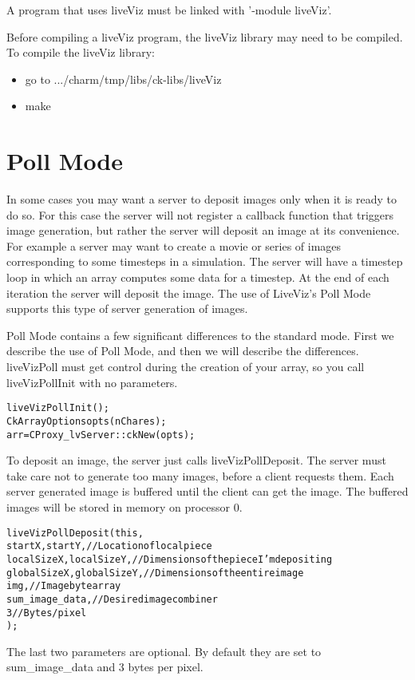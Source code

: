 A \charmpp{} program that uses liveViz must be linked with '-module liveViz'. 

Before compiling a liveViz program, the liveViz library may need to be compiled. 
To compile the liveViz library:
\begin{itemize}
\item go to .../charm/tmp/libs/ck-libs/liveViz
\item make
\end{itemize}


\section{Poll Mode}

In some cases you may want a server to deposit images only when it is ready to do so. 
For this case the server will not register a callback function that triggers image generation, but rather the server will deposit an image at its convenience.
For example a server may want to create a movie or series of images corresponding to some
timesteps in a simulation. The server will have a timestep loop in which an array computes 
some data for a timestep. At the end of each iteration the server will deposit the image. The use of LiveViz's Poll Mode supports this type of server generation of images.

Poll Mode contains a few significant differences to the standard mode. First we describe the use of Poll Mode, and then we will describe the differences. liveVizPoll must get control during the creation of your array,
so you call liveVizPollInit with no parameters.

\begin{alltt}
	liveVizPollInit();
	CkArrayOptions opts(nChares);
	arr = CProxy_lvServer::ckNew(opts);
\end{alltt}

To deposit an image, the server just calls liveVizPollDeposit. The server must take care not to generate too many images, before a client requests them. Each server generated image is buffered until the client can get the image. The buffered images will be stored in memory on processor 0.

\begin{alltt}
  liveVizPollDeposit( this,
                      startX,startY,            // Location of local piece
                      localSizeX,localSizeY,    // Dimensions of the piece I'm depositing
                      globalSizeX,globalSizeY,  // Dimensions of the entire image
                      img,                      // Image byte array
                      sum_image_data,           // Desired image combiner
                      3                         // Bytes/pixel
                    );
\end{alltt}
The last two parameters are optional. By default they are set to sum\_image\_data and 3 bytes per pixel.



